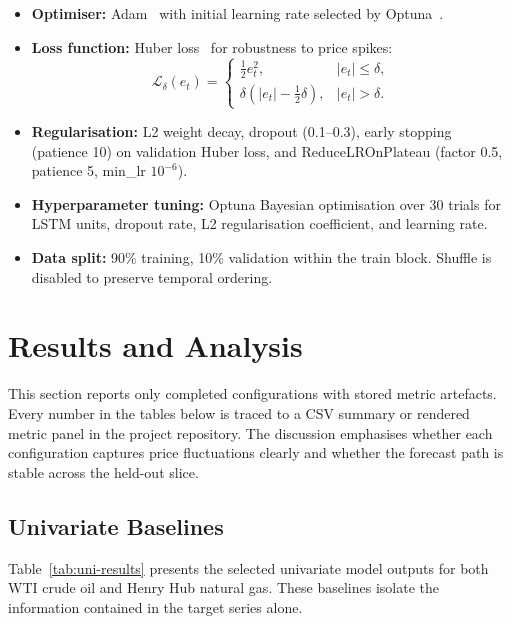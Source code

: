 \documentclass[12pt,a4paper]{article}
\begin{document}
\begin{itemize}[leftmargin=*]
  \item \textbf{Optimiser:} Adam~\citep{kingma2015adam} with initial learning rate selected by Optuna~\citep{akiba2019optuna}.
  \item \textbf{Loss function:} Huber loss~\citep{huber1964robust} for robustness to price spikes:
  \begin{equation}
    \mathcal{L}_{\delta}(e_t) =
    \begin{cases}
      \tfrac{1}{2}e_t^2, & |e_t| \le \delta,\\
      \delta\!\left(|e_t| - \tfrac{1}{2}\delta\right), & |e_t| > \delta.
    \end{cases}
    \label{eq:huber}
  \end{equation}
  \item \textbf{Regularisation:} L2 weight decay, dropout (0.1–0.3), early stopping (patience 10) on validation Huber loss, and ReduceLROnPlateau (factor 0.5, patience 5, min\_lr $10^{-6}$).
  \item \textbf{Hyperparameter tuning:} Optuna Bayesian optimisation over 30 trials for LSTM units, dropout rate, L2 regularisation coefficient, and learning rate.
  \item \textbf{Data split:} 90\% training, 10\% validation within the train block. Shuffle is disabled to preserve temporal ordering.
\end{itemize}

\section{Results and Analysis}\label{sec:results}

This section reports only completed configurations with stored metric artefacts. Every number in the tables below is traced to a CSV summary or rendered metric panel in the project repository. The discussion emphasises whether each configuration captures price fluctuations clearly and whether the forecast path is stable across the held-out slice.

\subsection{Univariate Baselines}\label{sec:res-uni}

Table~\ref{tab:uni-results} presents the selected univariate model outputs for both WTI crude oil and Henry Hub natural gas. These baselines isolate the information contained in the target series alone.
\end{document}
